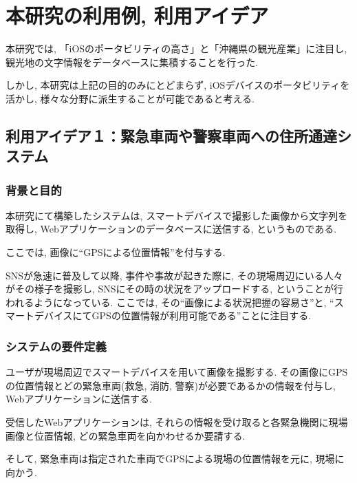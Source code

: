 \chapter{本研究の利用例, 利用アイデア}
\label{chap:utilization}

本研究では, 「iOSのポータビリティの高さ」と「沖縄県の観光産業」に注目し, 観光地の文字情報をデータベースに集積することを行った.

しかし, 本研究は上記の目的のみにとどまらず, iOSデバイスのポータビリティを活かし, 様々な分野に派生することが可能であると考える.

\section{利用アイデア１：緊急車両や警察車両への住所通達システム}
\subsection{背景と目的}
本研究にて構築したシステムは, スマートデバイスで撮影した画像から文字列を取得し, Webアプリケーションのデータベースに送信する, というものである.

ここでは, 画像に“GPSによる位置情報”を付与する.

SNSが急速に普及して以降, 事件や事故が起きた際に, その現場周辺にいる人々がその様子を撮影し, SNSにその時の状況をアップロードする, ということが行われるようになっている.
ここでは, その“画像による状況把握の容易さ”と, “スマートデバイスにてGPSの位置情報が利用可能である”ことに注目する.

\subsection{システムの要件定義}
ユーザが現場周辺でスマートデバイスを用いて画像を撮影する.
その画像にGPSの位置情報とどの緊急車両(救急, 消防, 警察)が必要であるかの情報を付与し, Webアプリケーションに送信する.

受信したWebアプリケーションは, それらの情報を受け取ると各緊急機関に現場画像と位置情報, どの緊急車両を向かわせるか要請する.

そして, 緊急車両は指定された車両でGPSによる現場の位置情報を元に, 現場に向かう.

